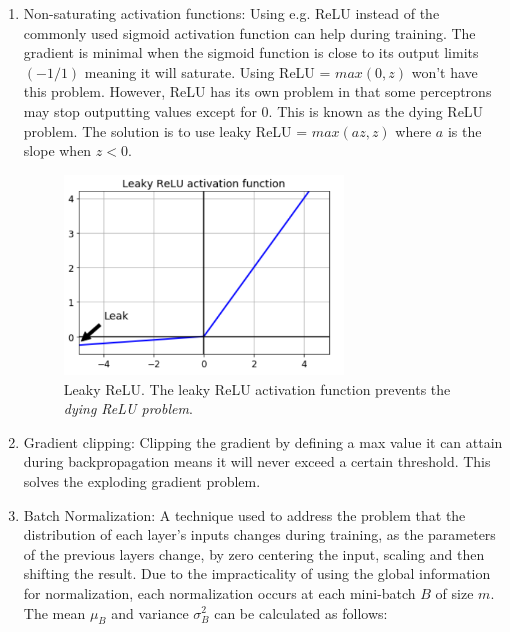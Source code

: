 \documentclass[english, bibtex]{kththesis}
\begin{document}
\begin{enumerate}
\item Non-saturating activation functions: Using e.g. ReLU\cite{maas2013rectifier} instead of the commonly used sigmoid activation function can help during training. The gradient is minimal when the sigmoid function is close to its output limits $(-1/1)$ meaning it will saturate. Using ReLU = $max(0,z)$ won't have this problem. However, ReLU has its own problem in that some perceptrons may stop outputting values except for 0. This is known as the dying ReLU problem. The solution is to use leaky ReLU = $max(az,z)$ where $a$ is the slope when $z < 0$. 

\begin{figure}[H]
  \begin{center}
    \includegraphics[width=0.7\textwidth]{figures/leaky_relu.png}
  \end{center}
  \caption{Leaky ReLU\cite{Wang_2019}. The leaky ReLU activation function prevents the \textit{dying ReLU problem}.}
  \label{fig:leaky_relu}
\end{figure}

\item Gradient clipping\cite{quintana1974clipping}: Clipping the gradient by defining a max value it can attain during backpropagation means it will never exceed a certain threshold. This solves the exploding gradient problem.

\item Batch Normalization\cite{ioffe2015batch}: A technique used to address the problem that the distribution of each layer’s inputs changes during training, as the parameters of the previous layers change, by zero centering the input, scaling and then shifting the result. Due to the impracticality of using the global information for normalization, each normalization occurs at each mini-batch $B$ of size $m$. The mean $\mu_{B}$ and variance $\sigma_B^2$ can be calculated as follows:


\end{enumerate}
\end{document}
